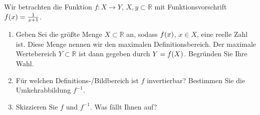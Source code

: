 \documentclass[german,12pt]{homework}
\newcommand{\RR}{\mathbb{R}}
\DeclarePairedDelimiter{\enbrace}{(}{)}
\begin{document}
    \begin{problem}
        Wir betrachten die Funktion \(f: X \to Y\), \(X, y \subset \RR\) mit
        Funktionsvorschrift \(f\enbrace*{x} = \frac{1}{x + 1}\).
        \begin{enumerate}
            \item Geben Sei die größte Menge \(X \subset \RR\) an, sodass
            \(f\enbrace*{x}\), \(x \in X\), eine reelle Zahl ist. Diese Menge
            nennen wir den maximalen Definitionsbereich. Der maximale
            Wertebereich \(Y \subset \RR\) ist dann gegeben durch \(Y =
            f\enbrace*{X}\). Begründen Sie Ihre Wahl.
            \item Für welchen Definitions-/Bildbereich ist \(f\) invertierbar?
            Bestimmen Sie die Umkehrabbildung \(f^{-1}\).
            \item Skizzieren Sie \(f\) und \(f^{-1}\). Was fällt Ihnen auf?
        \end{enumerate}
    \end{problem}
\end{document}
